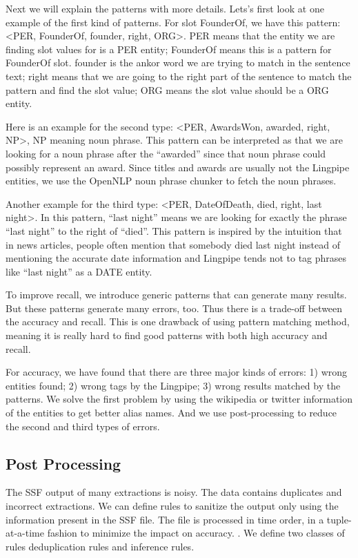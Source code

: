 Next we will explain the patterns with more details. Lets’s first look at one example of the first kind of patterns. For slot FounderOf, we have this pattern: \textless PER, FounderOf, founder, right, ORG\textgreater. PER means that the entity we are finding slot values for is a PER entity; FounderOf means this is a pattern for FounderOf slot. founder is the ankor word we are trying to match in the sentence text; right means that we are going to the right part of the sentence to match the pattern and find the slot value; ORG means the slot value should be a ORG entity.

Here is an example for the second type: \textless PER, AwardsWon, awarded, right, NP\textgreater, NP meaning noun phrase. This pattern can be interpreted as that we are looking for a noun phrase after the “awarded” since that noun phrase could possibly represent an award. Since titles and awards are usually not the Lingpipe entities, we use the OpenNLP noun phrase chunker to fetch the noun phrases.

Another example for the third type: \textless PER, DateOfDeath, died, right, last night\textgreater. In this pattern, “last night” means we are looking for exactly the phrase “last night” to the right of “died”. This pattern is inspired by the intuition that in news articles, people often mention that somebody died last night instead of mentioning the accurate date information and Lingpipe tends not to tag phrases like “last night” as a DATE entity. 

To improve recall, we introduce generic patterns that can generate many results. But these patterns generate many errors, too. Thus there is a trade-off between the accuracy and recall. This is one drawback of using pattern matching method, meaning it is really hard to find good patterns with both high accuracy and recall. 

For accuracy, we have found that there are three major kinds of errors: 1) wrong entities found; 2) wrong tags by the Lingpipe; 3) wrong results matched by the patterns. We solve the first problem by using the wikipedia or twitter information of the entities to get better alias names. And we use post-processing to reduce the second and third types of errors.

\subsection{Post Processing}

The SSF output of many extractions is noisy. The data contains duplicates and incorrect extractions. We can define rules to sanitize the output only using the information present in the SSF file. The file is processed in time order, in a tuple-at-a-time fashion to minimize the impact on accuracy. . We define two classes of rules deduplication rules and inference rules.

